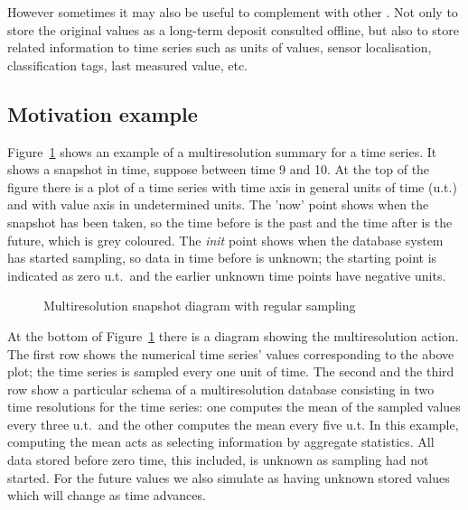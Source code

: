 However sometimes it may also be useful to complement 
with other . Not only to store the original values as a
long-term deposit consulted offline, but also to store related
information to time series such as units of values, sensor
localisation, classification tags, last measured value, etc.



\subsection{Motivation example}

Figure~\ref{fig:mtsms:sequence} shows an example of a multiresolution
summary for a time series. It shows a snapshot in time, suppose
between time 9 and 10. At the top of the figure there is a plot of a
time series with time axis in general units of time (u.t.) and with
value axis in undetermined units. The 'now' point shows when the
snapshot has been taken, so the time before is the past and the time
after is the future, which is grey coloured. The \emph{init} point
shows when the database system has started sampling, so data in time
before is unknown; the starting point is indicated as zero u.t.\ and
the earlier unknown time points have negative units.


\begin{figure}
  \centering
  
  \caption{Multiresolution snapshot diagram with regular sampling}
  \label{fig:mtsms:sequence}
\end{figure}


%   



At the bottom of Figure~\ref{fig:mtsms:sequence} there is a diagram
showing the multiresolution action. The first row shows the numerical
time series' values corresponding to the above plot; the time series
is sampled every one unit of time. The second and the third row show a
particular schema of a multiresolution database consisting in two time
resolutions for the time series: one computes the mean of the sampled
values every three u.t.\ and the other computes the mean every five
u.t. In this example, computing the mean acts as selecting information
by aggregate statistics. All data stored before zero time, this
included, is unknown as sampling had not started. For the future
values we also simulate as having unknown stored values which will
change as time advances.

